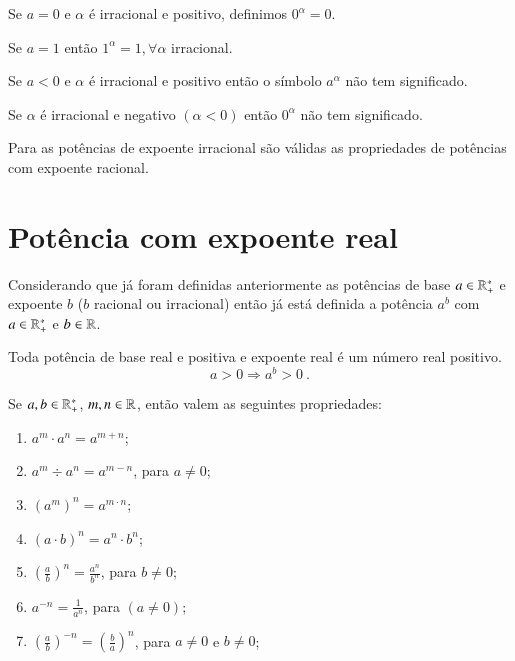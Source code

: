  Se $a=0$ e $\alpha$ é irracional e positivo, definimos $0^{\alpha}=0$.
 
 \begin{obs}
 Se $a=1$ então $1^{\alpha}= 1, \forall \alpha$ irracional.
 \end{obs}
 
 \begin{obs}
 Se $a < 0$ e $\alpha$ é irracional e positivo então o símbolo $a^{\alpha}$ não tem significado.
 \end{obs}
 
 \begin{obs}
 Se $\alpha$ é irracional e negativo $(\alpha < 0)$ então $0^{\alpha}$ não tem significado.
 \end{obs}
 
 \begin{obs}
 Para as potências de expoente irracional são válidas as propriedades de potências com expoente racional.
 \end{obs}

 \section{Potência com expoente real}
 
 Considerando que já foram definidas anteriormente as potências de base $a \in \mathbb{R}^{*}_{+}$ e expoente $b$ ($b$ racional ou  irracional) então já está definida a potência $a^b$ com $a \in \mathbb{R}^{*}_{+}$ e $b \in \mathbb{R}$.
 
 \begin{obs}
 Toda potência de base real e positiva e expoente real é um número real positivo.
 \[a> 0 \Rightarrow a^b > 0 \ .\]
 \end{obs}
 
  Se $a, b \in \mathbb{R}^{*}_{+}$, $m, n \in \mathbb{R}$, então valem as seguintes propriedades:
 \begin{enumerate}[P1)]
 \item $a^m \cdot a^n= a^{m + n}$;
 \item $a^m \div a^n= a^{m - n}$, para $a \neq 0$;
 \item $(a^m)^n= a^{m \cdot n}$;
 \item $(a \cdot b)^n= a^n \cdot b^n$;
 \item $\left(\frac{a}{b}\right)^n= \frac{a^n}{b^n}$, para $b \neq 0$;
 \item $a^{-n}= \frac{1}{a^n}$, para $(a \neq 0)$;
 \item $\left(\frac{a}{b} \right)^{-n}= \left(\frac{b}{a} \right)^{n}$, para $a \neq 0$ e $b \neq 0$;
 \end{enumerate}
 


